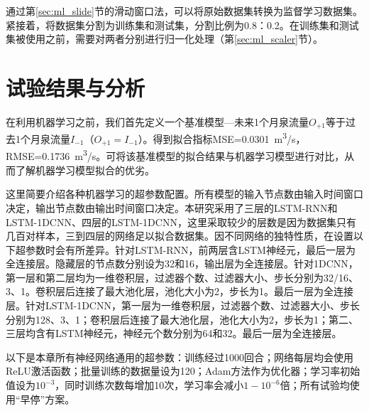 通过第\ref{sec:ml_slide}节的滑动窗口法，可以将原始数据集转换为监督学习数据集。紧接着，将数据集分割为训练集和测试集，分割比例为0.8：0.2。在训练集和测试集被使用之前，需要对两者分别进行归一化处理（第\ref{sec:ml_scaler}节）。

\section{试验结果与分析}\label{sec:spr_result}

在利用机器学习之前，我们首先定义一个基准模型---未来1个月泉流量$O_{+1}$等于过去1个月泉流量$I_{-1}$（$O_{+1}=I_{-1}$）。得到拟合指标MSE=\SI{0.0301}{m^{3}/s}，RMSE=\SI{0.1736}{m^{3}/s}。可将该基准模型的拟合结果与机器学习模型进行对比，从而了解机器学习模型拟合的优劣。

这里简要介绍各种机器学习的超参数配置。所有模型的输入节点数由输入时间窗口决定，输出节点数由输出时间窗口决定。本研究采用了三层的LSTM-RNN和LSTM-1DCNN、四层的LSTM-1DCNN，这里采取较少的层数是因为数据集只有几百对样本，三到四层的网络足以拟合数据集。因不同网络的独特性质，在设置以下超参数时会有所差异。针对LSTM-RNN，前两层含LSTM神经元，最后一层为全连接层。隐藏层的节点数分别设为32和16，输出层为全连接层。针对1DCNN，第一层和第二层均为一维卷积层，过滤器个数、过滤器大小、步长分别为32/16、3、1。卷积层后连接了最大池化层，池化大小为2，步长为1。最后一层为全连接层。针对LSTM-1DCNN，第一层为一维卷积层，过滤器个数、过滤器大小、步长分别为128、3、1；卷积层后连接了最大池化层，池化大小为2，步长为1；第二、三层均含有LSTM神经元，神经元个数分别为64和32。最后一层为全连接层。 

以下是本章所有神经网络通用的超参数：训练经过1000回合；网络每层均会使用ReLU激活函数；批量训练的数据量设为120；Adam方法作为优化器；学习率初始值设为$10^{-3}$，同时训练次数每增加10次，学习率会减小$1-10^{-6}$倍；所有试验均使用“早停”方案。

